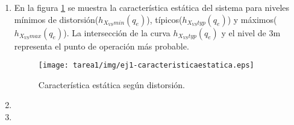 \begin{ejercicio}
\begin{enumerate}
    \item %
    En la figura \ref{ej1:img1} se muestra la característica estática del sistema para niveles mínimos de distorsión($h_{X_{VS}min}(q_e)$), típicos($h_{X_{VS}typ}(q_e)$) y máximos($h_{X_{VS}max}(q_e)$). La intersección de la curva $h_{X_{VS}typ}(q_e)$ y el nivel de 3m representa el punto de operación más probable.
    \begin{figure}[H]
      \centering
      \texttt{[image: tarea1/img/ej1-caracteristicaestatica.eps]}
      \caption{Característica estática según distorsión.}
      \label{ej1:img1}
    \end{figure}


    \item %

    \item %
    
  \end{enumerate}

\end{ejercicio}